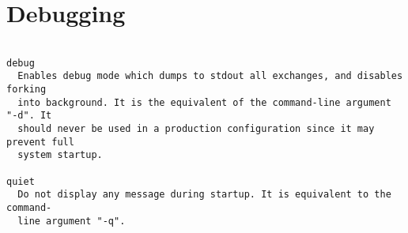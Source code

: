 
\section{Debugging}

\begin{verbatim}

debug
  Enables debug mode which dumps to stdout all exchanges, and disables forking
  into background. It is the equivalent of the command-line argument "-d". It
  should never be used in a production configuration since it may prevent full
  system startup.

quiet
  Do not display any message during startup. It is equivalent to the command-
  line argument "-q".

\end{verbatim}
